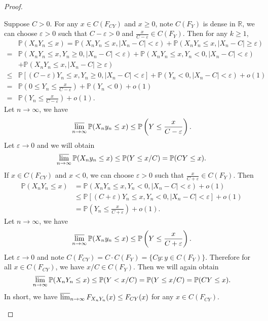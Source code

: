 \documentclass[12pt]{article}
\renewcommand{\(}{\left(}%
\renewcommand{\)}{\right)}%
\renewcommand{\[}{\left[}%
\renewcommand{\]}{\right]}%
\renewcommand{\r}{\mathbb{R}}
\newcommand{\p}{\mathbb{P}}
\newtheorem{proof}{Proof.}}
\begin{document}
\begin{proof}
\begin{enumerate}
  		Suppose $C>0$. For any $x\in C(F_{CY})$ and $x\geq 0$, note $C(F_Y)$ is dense in $\r$, we can choose $\varepsilon>0$ such that $C-\varepsilon>0$ and $\frac{x}{C-\varepsilon}\in C(F_Y)$. Then for any $k\geq 1$, 
  		\begin{equation*}
  			\begin{split}
  				&\p(X_nY_n\leq x)=\p(X_nY_n\leq x,|X_n-C|< \varepsilon)+\p(X_nY_n\leq x,|X_n-C|\geq  \varepsilon)\\
  				=& \p(X_nY_n\leq x,Y_n\geq 0,|X_n-C|< \varepsilon)+\p(X_nY_n\leq x,Y_n< 0,|X_n-C|< \varepsilon)\\
  				&+\p(X_nY_n\leq x,|X_n-C|\geq  \varepsilon)\\
  				\leq &\p[(C-\varepsilon)Y_n\leq x,Y_n\geq 0,|X_n-C|< \varepsilon]+\p(Y_n<0,|X_n-C|< \varepsilon)+o(1)\\
  				=&\p\(0\leq Y_n\leq \frac{x}{C-\varepsilon}\)+\p(Y_n<0)+o(1)\\
  				=&\p\(Y_n\leq \frac{x}{C-\varepsilon} \)+o(1).
  			\end{split}
  		\end{equation*}
  		Let $n\to\infty$, we have
  		\begin{equation*}
  			\varlimsup_{n\to\infty}\p(X_ny_n\leq x)\leq \p\(Y\leq \frac{x}{C-\varepsilon}\).
  		\end{equation*}
  		Let $\varepsilon\to0$ and we will obtain
  		\begin{equation*}
  			\varlimsup_{n\to\infty}\p(X_ny_n\leq x)\leq \p(Y\leq x/C)=\p(CY\leq x).
  		\end{equation*}
  		If $x\in C(F_{CY})$ and $x< 0$, we can choose $\varepsilon>0$ such that $\frac{x}{C+\varepsilon}\in C(F_Y)$. Then 
  		\begin{equation*}
  			\begin{split}
  				\p(X_nY_n\leq x)&=\p(X_nY_n\leq x,Y_n< 0,|X_n-C|< \varepsilon)+o(1)\\
  				&\leq \p[(C+\varepsilon)Y_n\leq x,Y_n<0,|X_n-C|< \varepsilon]+o(1)\\
  				&=\p\(Y_n\leq \frac{x}{C+\varepsilon} \)+o(1).
  			\end{split}
  		\end{equation*}
  		Let $n\to\infty$, we have
  		\begin{equation*}
  			\varlimsup_{n\to\infty}\p(X_ny_n\leq x)\leq \p\(Y\leq \frac{x}{C+\varepsilon}\).
  		\end{equation*}
  		Let $\varepsilon\to 0$ and note $C(F_{CY})=C\cdot C(F_Y)=\{Cy:y\in C(F_Y)\}$. Therefore for all $x\in C(F_{CY})$, we have $x/C\in C(F_Y)$. Then we will again obtain
  		\begin{equation*}
  			\varlimsup_{n\to\infty}\p(X_nY_n\leq x)\leq \p(Y< x/C)=\p(Y\leq x/C)=\p(CY\leq x).
  		\end{equation*}
  		In short, we have $\varlimsup_{n\to\infty} F_{X_nY_n}(x)\leq F_{CY}(x)$ for any $x\in C(F_{CY})$.
  		

\end{enumerate}
\end{proof}
\end{document}
